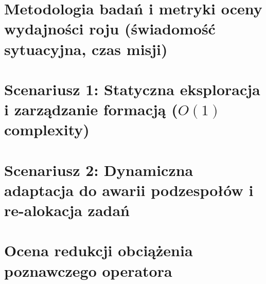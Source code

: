 \documentclass[12pt,a4paper,twoside]{report}
\theoremstyle{definition} %
\begin{document}
\section{Metodologia badań i metryki oceny wydajności roju (świadomość sytuacyjna, czas misji)}
\section{Scenariusz 1: Statyczna eksploracja i zarządzanie formacją ($O(1)$ complexity)}
\section{Scenariusz 2: Dynamiczna adaptacja do awarii podzespołów i re-alokacja zadań}
\section{Ocena redukcji obciążenia poznawczego operatora}

\cleardoublepage
\end{document}
